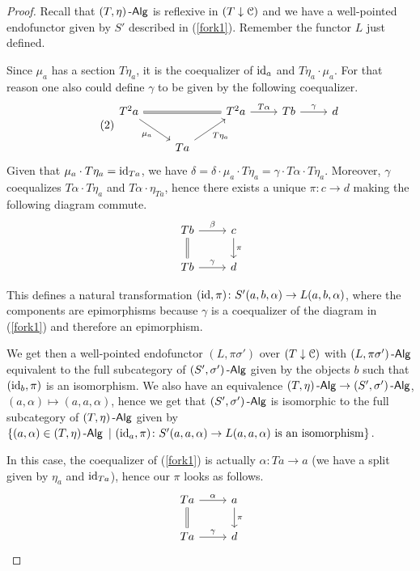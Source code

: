 \documentclass[a4paper,11pt,oneside,openany]{scrbook}
\begin{document}
\begin{proof}
	Recall that $(T,\eta)\operatorname{-\mathsf{Alg}}$ is reflexive in $(T\downarrow\operatorname{\mathcal{C}})$ and we have a
    well-pointed endofunctor given by $S'$ described in (\ref{fork1}). Remember
    the functor $L$ just defined.

	Since $\mu_a$ has a section $T\eta_a$, it is the coequalizer of $\operatorname{id}_a$ and
    $T\eta_a\cdot\mu_a$. For that reason one also could define $\gamma$ to be
    given by the following coequalizer.
	\[
		\tag{2}\label{fork2}
		\begin{tikzcd}
			T^2a\ar[rr, equal]\ar[dr, swap, "\mu_a"]
			&& T^2a\ar[r, "T\alpha"]
			& Tb\ar[r, "\gamma"]
			& d \\
			& Ta\ar[ur, swap, "T\eta_a"]
		\end{tikzcd}
	\]
	Given that $\mu_a\cdot T\eta_a=\operatorname{id}_{Ta}$, we have
    $\delta=\delta\cdot\mu_a\cdot T\eta_a=\gamma\cdot T\alpha\cdot T\eta_a$.
    Moreover, $\gamma$ coequalizes $T\alpha\cdot T\eta_a$ and
    $T\alpha\cdot\eta_{Ta}$, hence there exists a unique $\pi\colon c\rightarrow
    d$ making the following diagram commute.
	\[
		\begin{tikzcd}
			Tb\ar[d, equal]\ar[r, "\beta"]
			& c\ar[d, "\pi"] \\
			Tb\ar[r, "\gamma"]
			& d
		\end{tikzcd}
	\]

	This defines a natural transformation $(\operatorname{id},\pi)\colon
    S'(a,b,\alpha)\rightarrow L(a,b,\alpha)$, where the components are
    epimorphisms because $\gamma$ is a coequalizer of the diagram in
    (\ref{fork1}) and therefore an epimorphism.

	We get then a well-pointed endofunctor $(L,\pi\sigma')$ over
    $(T\downarrow\operatorname{\mathcal{C}})$ with $(L,\pi\sigma')\operatorname{-\mathsf{Alg}}$ equivalent to the full
    subcategory of $(S',\sigma')\operatorname{-\mathsf{Alg}}$ given by the objects $b$ such that
    $(\operatorname{id}_b,\pi)$ is an isomorphism. We also have an equivalence
    $(T,\eta)\operatorname{-\mathsf{Alg}}\rightarrow (S',\sigma')\operatorname{-\mathsf{Alg}}$, $(a,\alpha)\mapsto
    (a,a,\alpha)$, hence we get that $(S',\sigma')\operatorname{-\mathsf{Alg}}$ is isomorphic to the
    full subcategory of $(T,\eta)\operatorname{-\mathsf{Alg}}$ given by $\{(a,\alpha)\in (T,\eta)\operatorname{-\mathsf{Alg}}\
    |\ (\operatorname{id}_a,\pi)\colon S'(a,a,\alpha)\rightarrow L(a,a,\alpha)\text{ is an
    isomorphism}\}$.

	In this case, the coequalizer of (\ref{fork1}) is actually $\alpha\colon
    Ta\rightarrow a$ (we have a split given by $\eta_{a}$ and $\operatorname{id}_{Ta}$), hence
    our $\pi$ looks as follows.
	\[
		\begin{tikzcd}
			Ta\ar[d, equal]\ar[r, "\alpha"]
			& a\ar[d, "\pi"] \\
			Ta\ar[r, "\gamma"]
			& d
		\end{tikzcd}
	\]


\end{proof}
\end{document}
